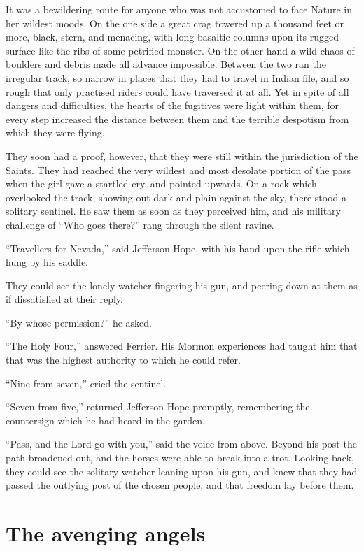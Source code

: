 \documentclass[12pt]{book}
\begin{document}
It was a bewildering route for anyone who was not accustomed to face Nature in her wildest moods. On the one side a great crag towered up a thousand feet or more, black, stern, and menacing, with long basaltic columns upon its rugged surface like the ribs of some petrified monster. On the other hand a wild chaos of boulders and debris made all advance impossible. Between the two ran the irregular track, so narrow in places that they had to travel in Indian file, and so rough that only practised riders could have traversed it at all. Yet in spite of all dangers and difficulties, the hearts of the fugitives were light within them, for every step increased the distance between them and the terrible despotism from which they were flying. 

They soon had a proof, however, that they were still within the jurisdiction of the Saints. They had reached the very wildest and most desolate portion of the pass when the girl gave a startled cry, and pointed upwards. On a rock which overlooked the track, showing out dark and plain against the sky, there stood a solitary sentinel. He saw them as soon as they perceived him, and his military challenge of “Who goes there?” rang through the silent ravine. 

“Travellers for Nevada,” said Jefferson Hope, with his hand upon the rifle which hung by his saddle. 

They could see the lonely watcher fingering his gun, and peering down at them as if dissatisfied at their reply. 

“By whose permission?” he asked. 

“The Holy Four,” answered Ferrier. His Mormon experiences had taught him that that was the highest authority to which he could refer. 

“Nine from seven,” cried the sentinel. 

“Seven from five,” returned Jefferson Hope promptly, remembering the countersign which he had heard in the garden. 

“Pass, and the Lord go with you,” said the voice from above. Beyond his post the path broadened out, and the horses were able to break into a trot. Looking back, they could see the solitary watcher leaning upon his gun, and knew that they had passed the outlying post of the chosen people, and that freedom lay before them. 







\chapter{The avenging angels} 
\end{document}
